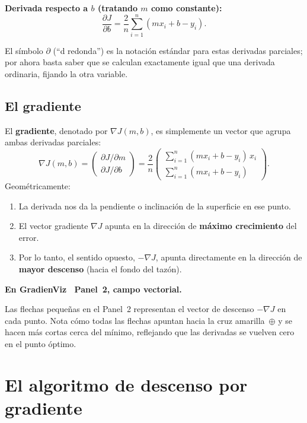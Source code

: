 \documentclass[12pt, a4paper]{article}
\newenvironment{viznota}[1]{%
    \begin{mdframed}[style=vizverde]
    \textbf{\color{bordeteo}En GradienViz \textemdash\ #1.}\quad
}{%
    \end{mdframed}
}
\newcommand{\grad}{\nabla}
\begin{document}
\textbf{Derivada respecto a $b$ (tratando $m$ como constante):}
\begin{equation}\label{eq:gb}
    \frac{\partial J}{\partial b} = \frac{2}{n}\sum_{i=1}^{n}(m x_i + b - y_i).
\end{equation}

El símbolo $\partial$ (``d redonda'') es la notación estándar para estas derivadas parciales; por ahora basta saber que se calculan exactamente igual que una derivada ordinaria, fijando la otra variable.

\subsection{El gradiente}

El \textbf{gradiente}, denotado por $\grad J(m, b)$, es simplemente un vector que agrupa ambas derivadas parciales:
\[
    \grad J(m, b) =
    \begin{pmatrix} \partial J/\partial m \\[4pt] \partial J/\partial b \end{pmatrix}
    = \frac{2}{n}\begin{pmatrix}
        \displaystyle\sum_{i=1}^{n}(m x_i + b - y_i)\,x_i \\[8pt]
        \displaystyle\sum_{i=1}^{n}(m x_i + b - y_i)
    \end{pmatrix}.
\]
Geométricamente:
\begin{enumerate}[label=(\roman*)]
    \item La derivada nos da la pendiente o inclinación de la superficie en ese punto.
    \item El vector gradiente $\grad J$ apunta en la dirección de \textbf{máximo crecimiento} del error.
    \item Por lo tanto, el sentido opuesto, $-\grad J$, apunta directamente en la dirección de \textbf{mayor descenso} (hacia el fondo del tazón).
\end{enumerate}

\begin{viznota}{Panel~2, campo vectorial}
Las flechas pequeñas en el Panel~2 representan el vector de descenso $-\grad J$ en cada punto. Nota cómo todas las flechas apuntan hacia la cruz amarilla~$\oplus$ y se hacen más cortas cerca del mínimo, reflejando que las derivadas se vuelven cero en el punto óptimo.
\end{viznota}

\section{El algoritmo de descenso por gradiente}
\end{document}
